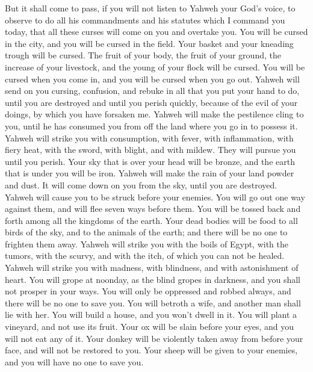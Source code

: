  But it shall come to pass, if you will not listen to
Yahweh your God's voice, to observe to do all his commandments and his
statutes which I command you today, that all these curses will come on
you and overtake you.  You will be cursed in the city, and
you will be cursed in the field.  Your basket and your
kneading trough will be cursed.  The fruit of your body,
the fruit of your ground, the increase of your livestock, and the young
of your flock will be cursed.  You will be cursed when you
come in, and you will be cursed when you go out.  Yahweh
will send on you cursing, confusion, and rebuke in all that you put your
hand to do, until you are destroyed and until you perish quickly,
because of the evil of your doings, by which you have forsaken me.
 Yahweh will make the pestilence cling to you, until he has
consumed you from off the land where you go in to possess it.
 Yahweh will strike you with consumption, with fever, with
inflammation, with fiery heat, with the sword, with blight, and with
mildew. They will pursue you until you perish.  Your sky
that is over your head will be bronze, and the earth that is under you
will be iron.  Yahweh will make the rain of your land
powder and dust. It will come down on you from the sky, until you are
destroyed.  Yahweh will cause you to be struck before your
enemies. You will go out one way against them, and will flee seven ways
before them. You will be tossed back and forth among all the kingdoms of
the earth.  Your dead bodies will be food to all birds of
the sky, and to the animals of the earth; and there will be no one to
frighten them away.  Yahweh will strike you with the boils
of Egypt, with the tumors, with the scurvy, and with the itch, of which
you can not be healed.  Yahweh will strike you with
madness, with blindness, and with astonishment of heart. 
You will grope at noonday, as the blind gropes in darkness, and you
shall not prosper in your ways. You will only be oppressed and robbed
always, and there will be no one to save you.  You will
betroth a wife, and another man shall lie with her. You will build a
house, and you won't dwell in it. You will plant a vineyard, and not use
its fruit.  Your ox will be slain before your eyes, and you
will not eat any of it. Your donkey will be violently taken away from
before your face, and will not be restored to you. Your sheep will be
given to your enemies, and you will have no one to save you.
